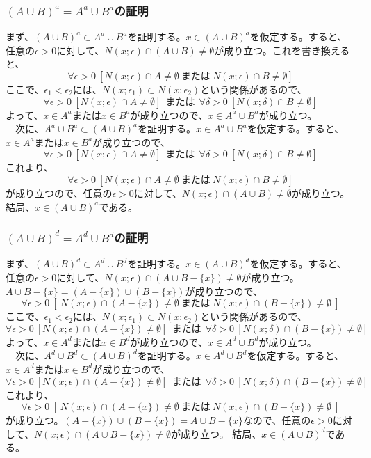\documentclass{jsarticle}
\begin{document}
\subsubsection{$(A\cup B)^a=A^a\cup B^a$の証明}
まず、$(A\cup B)^a\subset A^a\cup B^a$を証明する。$x\in (A\cup B)^a$を仮定する。すると、任意の$\epsilon>0$に対して、$N(x;\epsilon)\cap(A\cup B)\neq \emptyset$が成り立つ。これを書き換えると、
\[\forall\epsilon>0\ [N(x;\epsilon)\cap A\neq\emptyset\ または\ N(x;\epsilon)\cap B\neq\emptyset]\]
ここで、$\epsilon_1 < \epsilon_2$には、$N(x;\epsilon_1)\subset N(x;\epsilon_2)$という関係があるので、
\[\forall\epsilon>0\ [N(x;\epsilon)\cap A\neq\emptyset]\ \ または\ \ \forall\delta>0\ [N(x;\delta)\cap B\neq\emptyset]\]
よって、$x\in A^a$または$x\in B^a$が成り立つので、$x\in A^a\cup B^a$が成り立つ。\\
　次に、$A^a\cup B^a\subset(A\cup B)^a$を証明する。$x\in A^a\cup B^a$を仮定する。すると、$x\in A^a$または$x\in B^a$が成り立つので、
\[\forall\epsilon>0\ [N(x;\epsilon)\cap A\neq\emptyset]\ \ または\ \ \forall\delta>0\ [N(x;\delta)\cap B\neq\emptyset]\]
これより、
\[\forall\epsilon>0\ [N(x;\epsilon)\cap A\neq\emptyset\ または\ N(x;\epsilon)\cap B\neq\emptyset]\]
が成り立つので、任意の$\epsilon>0$に対して、$N(x;\epsilon)\cap(A\cup B)\neq \emptyset$が成り立つ。
結局、$x\in (A\cup B)^a$である。

\subsubsection{$(A\cup B)^d=A^d\cup B^d$の証明}
まず、$(A\cup B)^d\subset A^d\cup B^d$を証明する。$x\in (A\cup B)^d$を仮定する。すると、任意の$\epsilon>0$に対して、$N(x;\epsilon)\cap(A\cup B-\{x\})\neq \emptyset$が成り立つ。$A\cup B-\{x\}=(A-\{x\})\cup(B-\{x\})$が成り立つので、
\[\forall\epsilon>0\ [\ N(x;\epsilon)\cap (A-\{x\})\neq\emptyset\ または\ N(x;\epsilon)\cap (B-\{x\})\neq\emptyset\ ]\]
ここで、$\epsilon_1 < \epsilon_2$には、$N(x;\epsilon_1)\subset N(x;\epsilon_2)$という関係があるので、
\[\forall\epsilon>0\ [N(x;\epsilon)\cap (A-\{x\})\neq\emptyset]\ \ または\ \ \forall\delta>0\ [N(x;\delta)\cap (B-\{x\})\neq\emptyset]\]
よって、$x\in A^d$または$x\in B^d$が成り立つので、$x\in A^d\cup B^d$が成り立つ。\\
　次に、$A^d\cup B^d\subset(A\cup B)^d$を証明する。$x\in A^d\cup B^d$を仮定する。すると、$x\in A^d$または$x\in B^d$が成り立つので、
\[\forall\epsilon>0\ [N(x;\epsilon)\cap (A-\{x\})\neq\emptyset]\ \ または\ \ \forall\delta>0\ [N(x;\delta)\cap (B-\{x\})\neq\emptyset]\]
これより、
\[\forall\epsilon>0\ [\ N(x;\epsilon)\cap (A-\{x\})\neq\emptyset\ または\ N(x;\epsilon)\cap (B-\{x\})\neq\emptyset\ ]\]
が成り立つ。$(A-\{x\})\cup(B-\{x\})=A\cup B-\{x\}$なので、任意の$\epsilon>0$に対して、$N(x;\epsilon)\cap(A\cup B-\{x\})\neq \emptyset$が成り立つ。
結局、$x\in (A\cup B)^d$である。
\end{document}
